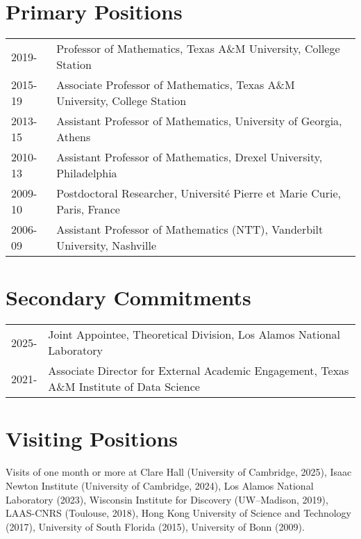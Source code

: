 \documentclass[11pt]{article}
\begin{document}
\section{Primary Positions}
\begin{tabular}{ll}

2019- & Professor of Mathematics, Texas A\&M University, College Station\\
2015-19 & Associate Professor of Mathematics, Texas A\&M University, College Station\\
2013-15 & Assistant Professor of Mathematics, University of Georgia, Athens\\
2010-13 & Assistant Professor of Mathematics,  Drexel University, Philadelphia\\
2009-10 & Postdoctoral Researcher,  Universit\'{e} Pierre et Marie Curie, Paris, France\\
2006-09 & Assistant Professor of Mathematics (NTT),  Vanderbilt University, Nashville
\end{tabular}


\section{Secondary Commitments} %
\begin{tabular}{ll}
2025-  & Joint Appointee,  Theoretical Division, Los Alamos National Laboratory\\
2021-  & Associate Director for External Academic Engagement, Texas A\&M Institute of Data Science
\end{tabular}


\section{Visiting Positions}
Visits of one month or more at
Clare Hall (University of Cambridge, 2025),
Isaac Newton Institute (University of Cambridge, 2024),
Los Alamos National Laboratory (2023),
Wisconsin Institute for Discovery (UW--Madison, 2019),
LAAS-CNRS (Toulouse, 2018),
Hong Kong University of Science and Technology (2017),
University of South Florida (2015),
University of Bonn (2009).
\end{document}

